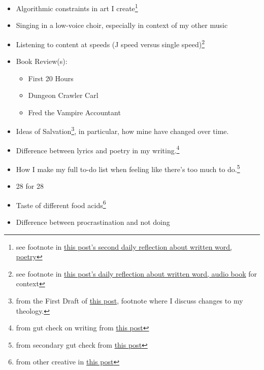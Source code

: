 \documentclass[12pt]{article}
\renewcommand{\,}{\textsuperscript{,}}
\begin{document}
\begin{itemize}
I wrote two drafts of it, one focused on the feeling of losing my mom and one on the idea of letting go of the attachments I have that don't serve me.   
Both are from July 2026.  
 \item Algorithmic constraints in art I create\footnote{see footnote in \href{reflection-june-2026}{this post's second daily reflection about written word, poetry}}  
 \item Singing in a low-voice choir, especially in context of my other music  
 \item Listening to content at speeds (J speed versus single speed)\footnote{see footnote in \href{reflection-2}{this post's daily reflection about written word, audio book} for context}  
 \item Book Review(s):  
 \begin{itemize}  
 \item First 20 Hours  
 \item Dungeon Crawler Carl  
 \item Fred the Vampire Accountant  
 \end{itemize}  
 \item Ideas of Salvation\footnote{from the First Draft of \href{reflection-2}{this post}, footnote where I discuss changes to my theology.}, in particular, how mine have changed over time.  
 \item Difference between lyrics and poetry in my writing.\footnote{from gut check on writing from \href{daily-reflection-2026-08-03}{this post}}  
 \item How I make my full to-do list when feeling like there's too much to do.\footnote{from secondary gut check from \href{daily-reflection-2026-08-03}{this post}}  
 \item 28 for 28  
 \item Taste of different food acids\footnote{from other creative in \href{songs-i-like}{this post}}  
\item Difference between procrastination and not doing  
\end{itemize}  
   
\end{document}
